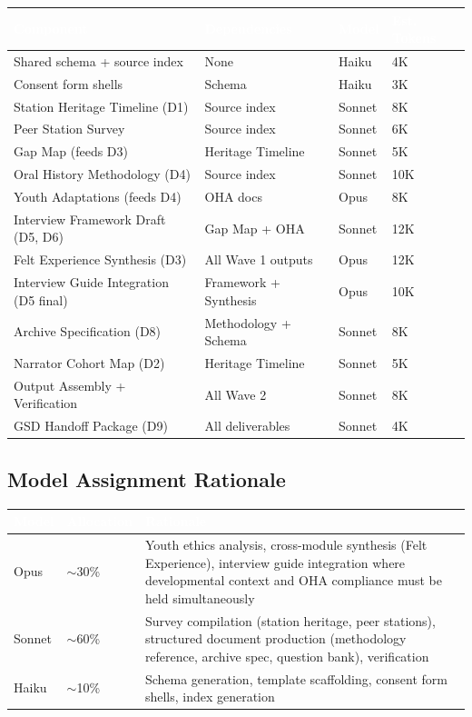 \documentclass[11pt,letterpaper]{article}
\newcommand{\tableheader}[1]{\textbf{\sffamily\textcolor{white}{#1}}}
\begin{document}
\begin{center}
\begin{tabularx}{\textwidth}{L{3.5cm}L{2.5cm}C{1.5cm}C{2cm}}
\toprule
{}
\tableheader{Component} & \tableheader{Dependencies} & \tableheader{Model} & \tableheader{Est. Tokens} \\
\midrule
Shared schema + source index & None & Haiku & 4K \\
Consent form shells & Schema & Haiku & 3K \\
Station Heritage Timeline (D1) & Source index & Sonnet & 8K \\
Peer Station Survey & Source index & Sonnet & 6K \\
Gap Map (feeds D3) & Heritage Timeline & Sonnet & 5K \\
Oral History Methodology (D4) & Source index & Sonnet & 10K \\
Youth Adaptations (feeds D4) & OHA docs & Opus & 8K \\
Interview Framework Draft (D5, D6) & Gap Map + OHA & Sonnet & 12K \\
Felt Experience Synthesis (D3) & All Wave 1 outputs & Opus & 12K \\
Interview Guide Integration (D5 final) & Framework + Synthesis & Opus & 10K \\
Archive Specification (D8) & Methodology + Schema & Sonnet & 8K \\
Narrator Cohort Map (D2) & Heritage Timeline & Sonnet & 5K \\
Output Assembly + Verification & All Wave 2 & Sonnet & 8K \\
GSD Handoff Package (D9) & All deliverables & Sonnet & 4K \\
\bottomrule
\end{tabularx}
\end{center}

\subsection{Model Assignment Rationale}

\begin{center}
\begin{tabularx}{\textwidth}{L{2cm}L{2cm}X}
\toprule
{}
\tableheader{Model} & \tableheader{Allocation} & \tableheader{Rationale} \\
\midrule
Opus & $\sim$30\% & Youth ethics analysis, cross-module synthesis (Felt Experience), interview guide integration where developmental context and OHA compliance must be held simultaneously \\
Sonnet & $\sim$60\% & Survey compilation (station heritage, peer stations), structured document production (methodology reference, archive spec, question bank), verification \\
Haiku & $\sim$10\% & Schema generation, template scaffolding, consent form shells, index generation \\
\bottomrule
\end{tabularx}
\end{center}
\end{document}
